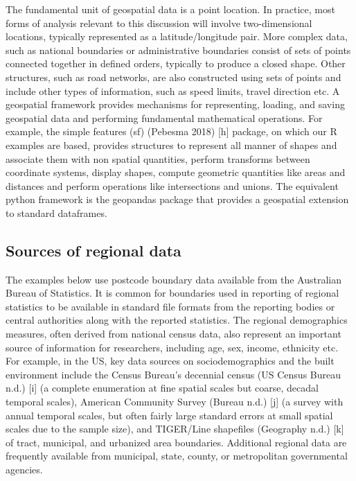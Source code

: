 \documentclass[]{article}
\begin{document}
The fundamental unit of geospatial data is a point location. In
practice, most forms of analysis relevant to this discussion will
involve two-dimensional locations, typically represented as a
latitude/longitude pair. More complex data, such as national boundaries
or administrative boundaries consist of sets of points connected
together in defined orders, typically to produce a closed shape. Other
structures, such as road networks, are also constructed using sets of
points and include other types of information, such as speed limits,
travel direction etc. A geospatial framework provides mechanisms for
representing, loading, and saving geospatial data and performing
fundamental mathematical operations. For example, the simple features
(sf) (Pebesma 2018) {[}h{]} package, on which our R examples are based,
provides structures to represent all manner of shapes and associate them
with non spatial quantities, perform transforms between coordinate
systems, display shapes, compute geometric quantities like areas and
distances and perform operations like intersections and unions. The
equivalent python framework is the geopandas package that provides a
geospatial extension to standard dataframes.

\hypertarget{sources-of-regional-data}{%
\subsection{Sources of regional data}\label{sources-of-regional-data}}

The examples below use postcode boundary data available from the
Australian Bureau of Statistics. It is common for boundaries used in
reporting of regional statistics to be available in standard file
formats from the reporting bodies or central authorities along with the
reported statistics. The regional demographics measures, often derived
from national census data, also represent an important source of
information for researchers, including age, sex, income, ethnicity etc.
For example, in the US, key data sources on sociodemographics and the
built environment include the Census Bureau's decennial census (US
Census Bureau n.d.) {[}i{]} (a complete enumeration at fine spatial
scales but coarse, decadal temporal scales), American Community Survey
(Bureau n.d.) {[}j{]} (a survey with annual temporal scales, but often
fairly large standard errors at small spatial scales due to the sample
size), and TIGER/Line shapefiles (Geography n.d.) {[}k{]} of tract,
municipal, and urbanized area boundaries. Additional regional data are
frequently available from municipal, state, county, or metropolitan
governmental agencies.
\end{document}
